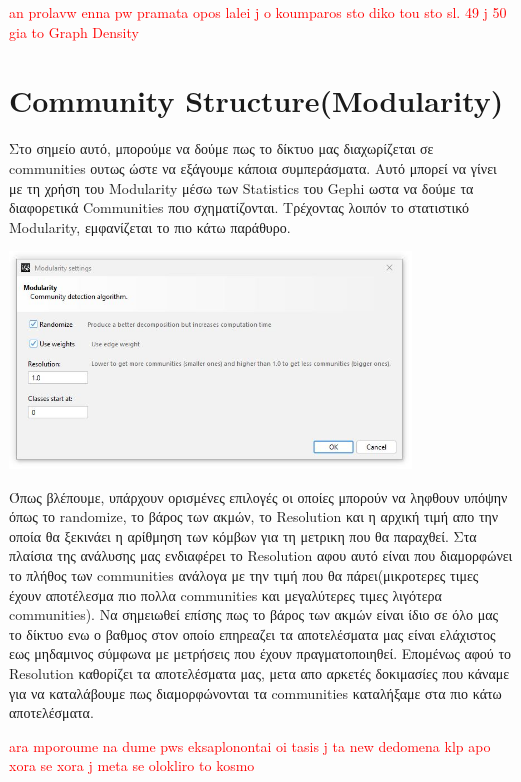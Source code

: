 \documentclass[12pt]{article}
\begin{document}
	\textcolor{red}{an prolavw enna pw pramata opos lalei j o koumparos sto diko tou sto sl. 49 j 50 gia to Graph Density}
	\label{chap:graph_density_11}
	
	
	
	
	\newpage
	\section{Community Structure(Modularity)}
	Στο σημείο αυτό, μπορούμε να δούμε πως το δίκτυο μας διαχωρίζεται σε communities ουτως ώστε να εξάγουμε κάποια συμπεράσματα. Αυτό μπορεί να γίνει με τη χρήση του Modularity μέσω των Statistics του Gephi ωστα να δούμε τα διαφορετικά Communities που σχηματίζονται. Τρέχοντας λοιπόν το στατιστικό Modularity, εμφανίζεται το πιο κάτω παράθυρο.
	\begin{center}
		\includegraphics[width=0.8\textwidth]{photos-files/section12/eisagogi_modularity_twn_statistics.JPG}
	\end{center}
	Όπως βλέπουμε, υπάρχουν ορισμένες επιλογές οι οποίες μπορούν να ληφθουν υπόψην όπως το randomize, το βάρος των ακμών, το Resolution και η αρχική τιμή απο την οποία θα ξεκινάει η αρίθμηση των κόμβων για τη μετρικη που θα παραχθεί. Στα πλαίσια της ανάλυσης μας ενδιαφέρει το Resolution αφου αυτό είναι που διαμορφώνει το πλήθος των communities ανάλογα με την τιμή που θα πάρει(μικροτερες τιμες έχουν αποτέλεσμα πιο πολλα communities και μεγαλύτερες τιμες λιγότερα communities). Να σημειωθεί επίσης πως το βάρος των ακμών είναι ίδιο σε όλο μας το δίκτυο ενω ο βαθμος στον οποίο επηρεαζει τα αποτελέσματα μας είναι ελάχιστος εως μηδαμινος σύμφωνα με μετρήσεις που έχουν πραγματοποιηθεί. Επομένως αφού το Resolution καθορίζει τα αποτελέσματα μας, μετα απο αρκετές δοκιμασίες που κάναμε για να καταλάβουμε πως διαμορφώνονται τα communities καταλήξαμε στα πιο κάτω αποτελέσματα.
	
	\textcolor{red}{ara mporoume na dume pws eksaplonontai oi tasis j ta new dedomena klp apo xora se xora j meta se olokliro to kosmo}
	
\end{document}
